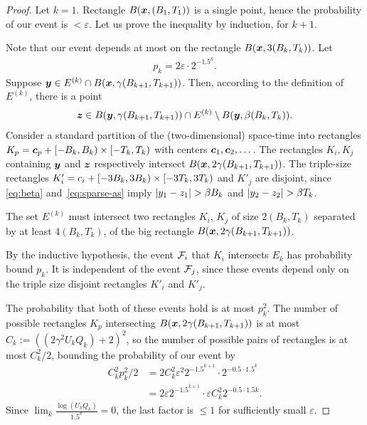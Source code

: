 \documentclass[12pt]{memoir}
\renewcommand{\le}{\leq}
\def\B{B}
\def\U{U}
\newcommand{\Tu}{T}
\begin{document}
\begin{proof}
Let \( k=1 \).
Rectangle \( B(\vek{x},(\B_1, \Tu_{1})) \) is a single point, hence
the probability of our event is \( <\varepsilon \).
Let us prove the inequality by induction, for \( k+1 \).

Note that our 
event depends at most on the rectangle \( B(\vek{x},3(\B_{k}, \Tu_{k})) \).
Let
\begin{align*}
   p_{k}=2\varepsilon\cdot 2^{-1.5^{k}}.
\end{align*}
Suppose \( \vek{y} \in E^{(k)}\cap B(\vek{x},\gamma(\B_{k+1}, \Tu_{k+1})  ) \).
Then, according to the definition of \( E^{(k)} \),  there is a point
\begin{align}\label{eq:sparse-as}
 \vek{z} \in
 B(\vek{y},\gamma(\B_{k+1},\Tu_{k+1}))\cap E^{(k)}\setminus B(\vek{y},\beta(\B_{k}, \Tu_{k})).
 \end{align}
Consider a standard partition of the (two-dimensional) space-time into
rectangles \( K_{p}=\vek{c}_{p}+\lint{-\B_{k}}{\B_k}\times \lint{-\Tu_{k}}{\Tu_{k}} \)
with centers \( \boldsymbol{c}_{1},\boldsymbol{c}_{2},\dots \).
The rectangles \( K_{i},K_{j} \) containing \( \boldsymbol{y} \) and \( \boldsymbol{z} \)
respectively intersect \( B(\vek{x}, 2\gamma(\B_{k+1}, \Tu_{k+1})) \).
The triple-size rectangles 
\( K'_{i}=c_{i} + \lint{-3\B_{k}}{3\B_k}\times \lint{-3\Tu_{k}}{3\Tu_{k}} \) and
\( K'_{j} \) are disjoint, since \eqref{eq:beta} and~\eqref{eq:sparse-as} imply
 \( \abs{y_1 - z_1}>\beta\B_{k} \) and \( \abs{y_2 - z_2}>\beta\Tu_{k} \).

The set \( E^{(k)} \) must intersect two rectangles \( K_{i} \),
\( K_{j} \) of size \( 2(\B_{k}, \Tu_{k}) \) separated by at least \( 4(\B_{k}, \Tu_{k}) \),
of the big rectangle \( B(\vek{x},2\gamma(\B_{k+1}, \Tu_{k+1})) \).

By the inductive hypothesis, the event \( \mathcal{F}_{i} \) that
\( K_{i} \) intersects \( E_{k} \) has probability bound \( p_{k} \).
It is independent of the event \( \mathcal{F}_{j} \), since these events depend
only on the triple size disjoint rectangles \( K'_{i} \) and \( K'_{j} \).

The probability that both of these events hold is at most \( p_{k}^{2} \).
The number of possible rectangles
\( K_{p} \) intersecting \( B(\vek{x},2\gamma(\B_{k+1}, \Tu_{k+1})) \) is
at most
\( C_{k}:=((2\gamma^{2}\U_{k} Q_{k})+2)^{2} \), so the number of possible pairs of rectangles
is at most \( C_{k}^{2}/2 \), bounding the probability of our event by
 \begin{align*}
   C_{k}^{2}p_{k}^{2}/2
    &=
      2 C_{k}^{2}\varepsilon^{2} 2^{-1.5^{k+1}}\cdot 2^{-0.5\cdot 1.5^{k}}
   \\ &=2\varepsilon 2^{-1.5^{k+1}} \cdot \varepsilon
        C_{k}^{2}2^{-0.5\cdot 1.5{k}}.
 \end{align*}
Since \( \lim_{k}\frac{\log{(\U_{k} Q_k)}}{1.5^k}=0 \),
the last factor is \( \le 1 \) for sufficiently small  \( \varepsilon \).
\end{proof}
\end{document}

